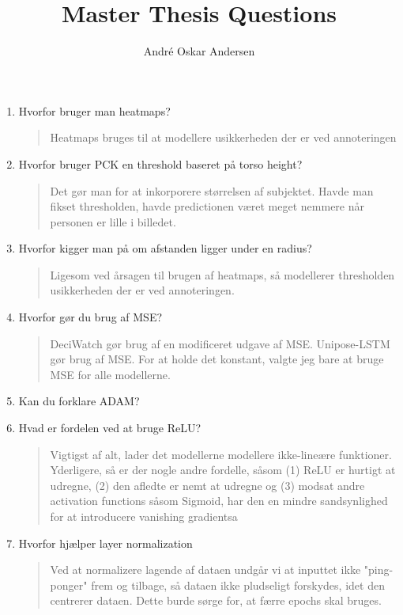 \documentclass[a4paper]{report}
\title{Master Thesis Questions}
\author{André Oskar Andersen}
\date{}
\begin{document}
    
\maketitle

\begin{enumerate}
    \item Hvorfor bruger man heatmaps?
    \begin{quote}
      Heatmaps bruges til at modellere usikkerheden der er ved annoteringen
    \end{quote}
    \item Hvorfor bruger PCK en threshold baseret på torso height?
    \begin{quote}
      Det gør man for at inkorporere størrelsen af subjektet. Havde man fikset thresholden, havde predictionen været meget nemmere når personen er lille i billedet.
    \end{quote}
    \item Hvorfor kigger man på om afstanden ligger under en radius?
    \begin{quote}
      Ligesom ved årsagen til brugen af heatmaps, så modellerer thresholden usikkerheden der er ved annoteringen.
    \end{quote}
    \item Hvorfor gør du brug af MSE?
    \begin{quote}
      DeciWatch gør brug af en modificeret udgave af MSE. Unipose-LSTM gør brug af MSE. For at holde det konstant, valgte jeg bare at bruge MSE for alle modellerne.
    \end{quote}
    \item Kan du forklare ADAM?
    \item Hvad er fordelen ved at bruge ReLU?
    \begin{quote}
      Vigtigst af alt, lader det modellerne modellere ikke-lineære funktioner. Yderligere, så er der nogle andre fordelle, såsom (1) ReLU er hurtigt at udregne, (2) den afledte er nemt at udregne og (3) modsat andre activation functions såsom Sigmoid, har den en mindre sandsynlighed for at introducere vanishing gradientsa
    \end{quote}
    \item Hvorfor hjælper layer normalization
    \begin{quote}
      Ved at normalizere lagende af dataen undgår vi at inputtet ikke "ping-ponger" frem og tilbage, så dataen ikke pludseligt forskydes, idet den centrerer dataen. Dette burde sørge for, at færre epochs skal bruges.
    \end{quote}

\end{enumerate}
\end{document}
